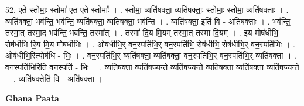 \documentclass[17pt]{extarticle}
\begin{document}
52. ए॒ते स्तोमाः॒ स्तोमा॑ ए॒त ए॒ते स्तोमाः᳚ । . स्तोमा॒ व्यति॑षक्ता॒ व्यति॑षक्ताः॒ स्तोमाः॒ स्तोमा॒ व्यति॑षक्ताः । . व्यति॑षक्ता॒ भव॑न्ति॒ भव॑न्ति॒ व्यति॑षक्ता॒ व्यति॑षक्ता॒ भव॑न्ति । . व्यति॑षक्ता॒ इति॑ वि - अति॑षक्ताः । . भव॑न्ति॒ तस्मा॒त् तस्मा॒द् भव॑न्ति॒ भव॑न्ति॒ तस्मा᳚त् । . तस्मा॑ दि॒य मि॒यम् तस्मा॒त् तस्मा॑ दि॒यम् । . इ॒य मोष॑धीभि॒ रोष॑धीभि रि॒य मि॒य मोष॑धीभिः । . ओष॑धीभि॒र् वन॒स्पति॑भि॒र् वन॒स्पति॑भि॒ रोष॑धीभि॒ रोष॑धीभि॒र् वन॒स्पति॑भिः । . ओष॑धीभि॒रित्योष॑धि - भिः॒ । . वन॒स्पति॑भि॒र् व्यति॑षक्ता॒ व्यति॑षक्ता॒ वन॒स्पति॑भि॒र् वन॒स्पति॑भि॒र् व्यति॑षक्ता । . वन॒स्पति॑भि॒रिति॒ वन॒स्पति॑ - भिः॒ । . व्यति॑षक्ता॒ व्यति॑षज्यन्ते॒ व्यति॑षज्यन्ते॒ व्यति॑षक्ता॒ व्यति॑षक्ता॒ व्यति॑षज्यन्ते । . व्यति॑ष॒क्तेति॑ वि - अति॑षक्ता । \newline

\textbf{Ghana Paata } \newline
\end{document}
